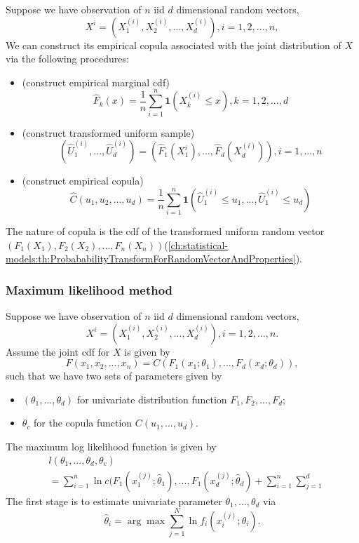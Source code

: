 \begin{refsection}
\begin{definition}\cite[424]{roncalli2016lecture}
Suppose we have observation of $n$ iid $d$ dimensional random vectors, $$X^i = (X_1^{(i)},X_2^{(i)},...,X_d^{(i)}),i=1,2,...,n,$$
We can construct its empirical copula associated with the joint distribution of $X$ via the following procedures:	
	\begin{itemize}
		\item (construct empirical marginal cdf)
		$$\hat{F}_k(x) = \frac{1}{n}\sum_{i=1}^{n}\bm{1}(X^{(i)}_k\leq x), k=1,2,...,d$$
		\item (construct transformed uniform sample)
		$$(\hat{U}_1^{(i)},...,\hat{U}_d^{(i)}) = (\hat{F}_1(X_1^i),...,\hat{F}_d(X_d^{(i)})),i=1,...,n$$
		\item (construct empirical copula)$$\hat{C}(u_1,u_2,...,u_d) = \frac{1}{n}\sum_{i=1}^n \bm{1}(\hat{U}_1^{(i)} \leq u_1,...,\hat{U}_1^{(i)} \leq u_d)$$
	\end{itemize}	
\end{definition}


\begin{remark}
	The nature of copula is the cdf of the transformed uniform random vector $(F_1(X_1),F_2(X_2),...,F_n(X_n))$(\autoref{ch:statistical-models:th:ProbababilityTransformForRandomVectorAndProperties}).
\end{remark}


\subsubsection{Maximum likelihood method}


\begin{lemma}\cite[429]{roncalli2016lecture}
Suppose we have observation of $n$ iid $d$ dimensional random vectors, $$X^i = (X_1^{(i)},X_2^{(i)},...,X_d^{(i)}),i=1,2,...,n.$$
Assume the joint cdf for $X$ is given by
$$F(x_1,x_2,...,x_n) = C(F_1(x_1;\theta_1),...,F_d(x_d;\theta_d)),$$
such that we have two sets of parameters given by
\begin{itemize}
	\item $(\theta_1,...,\theta_d)$ for univariate distribution function $F_1,F_2,...,F_d$;
	\item $\theta_c$ for the copula function $C(u_1,...,u_d)$.
\end{itemize}	
\end{lemma}

The maximum log likelihood function is given by
\begin{align*}
&l(\theta_1,...,\theta_d,\theta_c) \\
&
= \sum_{i=1}^{n} \ln c(F_1(x^{(j)}_1;\hat{\theta}_1),...,F_1(x^{(j)}_d;\hat{\theta}_d) + 
\sum_{i=1}^{n}\sum_{j=1}^{d} 
\end{align*}
The first stage is to estimate univariate parameter $\theta_1,...,\theta_d$ via
$$\hat{\theta}_i = \arg\max \sum_{j=1}^{N} \ln f_i(x^{(j)}_i;\theta_i).$$


\end{refsection}
